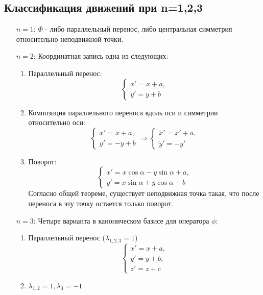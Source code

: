 \subsection{Классификация движений при n=1,2,3}
\begin{itemize}
    \item[$n=1$:] $\Phi$ - либо параллельный перенос, либо центральная симметрия относительно неподвижной точки.
    \item[$n=2$:] Координатная запись одна из следующих:
    \begin{enumerate}
        \item Параллельный перенос:
        \[\begin{cases}
            x'=x+a,\\
            y'=y+b
        \end{cases}
        \]
        \item Композиция параллельного переноса вдоль оси и симметрии относительно оси:
        \[
        \begin{cases}
            x'=x+a,\\
            y'=-y+b
        \end{cases} \Longrightarrow
        \begin{cases}
            \widetilde{x}'=x'+a,\\
            \widetilde{y}'=-y'
        \end{cases}
        \] 
        \item Поворот:
        \[
        \begin{cases}
            x'=x\cos{\alpha}-y\sin{\alpha}+a,\\
            y'=x\sin{\alpha}+y\cos{\alpha}+b
        \end{cases}
        \]
        Согласно общей теореме, существует неподвижная точка такая, что после переноса в эту точку остается только поворот.
    \end{enumerate}
    \item[$n=3$:] Четыре варианта в каноническом базисе для оператора $\phi$:
    \begin{enumerate}
        \item Параллельный перенос ($\lambda_{1,2,3}=1$)
        \[
        \begin{cases}
            x'=x+a,\\
            y'=y+b,\\
            z'=z+c
        \end{cases}
        \]
        \item $\lambda_{1,2}=1, \lambda_3=-1$

\end{enumerate}
\end{itemize}
